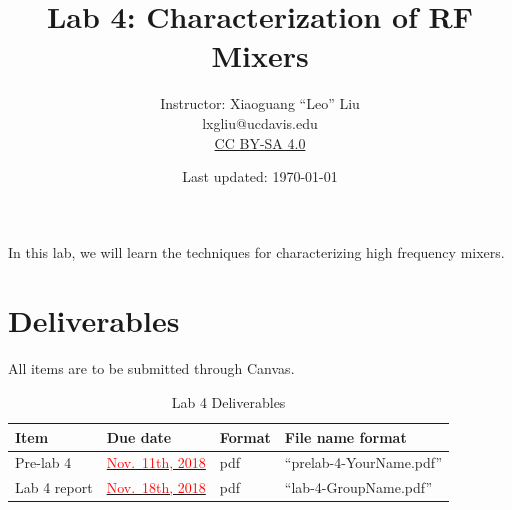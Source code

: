\documentclass[letterpaper, 11pt]{article}
\newcommand{\due}[1]{\href{https://github.com/ucdart/UCD-EEC134/blob/master/support/schedule/eec134-schedule.pdf}{\textcolor{red}{#1}}}
\begin{document}
\title{Lab 4: Characterization of RF Mixers}
\author{Instructor: Xiaoguang ``Leo'' Liu\\lxgliu@ucdavis.edu \\
	\small \href{http://creativecommons.org/licenses/by-sa/4.0/}{CC BY-SA 4.0}}
\date{Last updated: \today}

\maketitle

In this lab, we will learn the techniques for characterizing high frequency mixers. 

%



\section{Deliverables}
All items are to be submitted through Canvas.  

\vspace{0.5cm}

\begin{table}[h]
	\footnotesize
	\caption{Lab 4 Deliverables}
	\renewcommand{\arraystretch}{1.2}
	\begin{tabular}{|m{1in}|l|m{0.45in}|m{2in}|}
		\hline
		\textbf{Item} & \textbf{Due date} & \textbf{Format} & \textbf{File name format} \\
		\hline
		\hline
		Pre-lab 4 & \due{Nov.~11th, 2018} & pdf & ``prelab-4-YourName.pdf''\\
				
		\hline
		Lab 4 report & \due{Nov.~18th, 2018} & pdf & ``lab-4-GroupName.pdf''\\
		\hline
	\end{tabular}
	\label{tab:deliverables}
\end{table}
\end{document}
